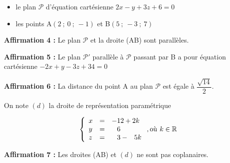 \documentclass[10pt]{article}
\providecommand{\R}{\mathbb{R}}
\begin{document}
\begin{itemize}[label={$\bullet~$}]
\item le plan $\mathcal{P}$ d'équation cartésienne $2x - y + 3z + 6 = 0$
\item les points A$(2~;~0~;~-1)$ et B$(5~;~-3~;~7)$
\end{itemize}

\textbf{Affirmation 4 :} \og Le plan $\mathcal{P}$ et la droite (AB) sont parallèles.\fg

\textbf{Affirmation 5 :} \og Le plan $\mathcal{P}'$ parallèle à $\mathcal{P}$ passant par B a pour équation cartésienne $-2x + y - 3z + 34 = 0$ \fg

\textbf{Affirmation 6 :} \og La distance du point A au plan $\mathcal{P}$ est égale à $\dfrac{\sqrt{14}}{2}$.\fg

\smallskip

On note $(d)$ la droite de représentation paramétrique

\[\left\{\begin{array}{l c l}
x &=&-12 + 2k\\
y &=&\phantom{-}6\\
z &=&\phantom{-}3 - \phantom{-}5k
\end{array}\right., \text{où}\, \:k \in \R\]

\textbf{Affirmation 7 :} \og Les droites (AB) et $(d)$ ne sont pas coplanaires. \fg

\bigskip
\end{document}
